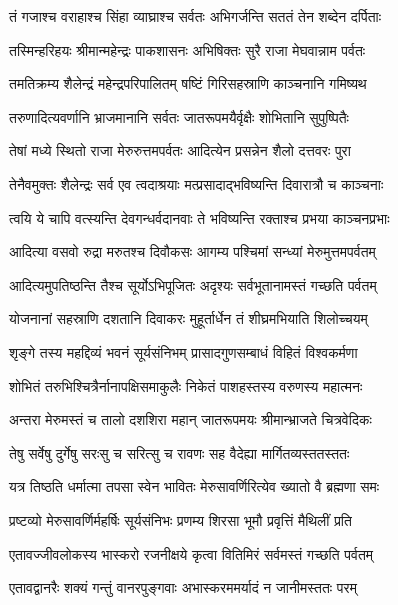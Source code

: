 \twolineshloka
{तं गजाश्च वराहाश्च सिंहा व्याघ्राश्च सर्वतः}
{अभिगर्जन्ति सततं तेन शब्देन दर्पिताः} %

\twolineshloka
{तस्मिन्हरिहयः श्रीमान्महेन्द्रः पाकशासनः}
{अभिषिक्तः सुरै राजा मेघवान्नाम पर्वतः} %

\twolineshloka
{तमतिक्रम्य शैलेन्द्रं महेन्द्रपरिपालितम्}
{षष्टिं गिरिसहस्राणि काञ्चनानि गमिष्यथ} %

\twolineshloka
{तरुणादित्यवर्णानि भ्राजमानानि सर्वतः}
{जातरूपमयैर्वृक्षैः शोभितानि सुपुष्पितैः} %

\twolineshloka
{तेषां मध्ये स्थितो राजा मेरुरुत्तमपर्वतः}
{आदित्येन प्रसन्नेन शैलो दत्तवरः पुरा} %

\twolineshloka
{तेनैवमुक्तः शैलेन्द्रः सर्व एव त्वदाश्रयाः}
{मत्प्रसादाद्भविष्यन्ति दिवारात्रौ च काञ्चनाः} %

\twolineshloka
{त्वयि ये चापि वत्स्यन्ति देवगन्धर्वदानवाः}
{ते भविष्यन्ति रक्ताश्च प्रभया काञ्चनप्रभाः} %

\twolineshloka
{आदित्या वसवो रुद्रा मरुतश्च दिवौकसः}
{आगम्य पश्चिमां सन्ध्यां मेरुमुत्तमपर्वतम्} %

\twolineshloka
{आदित्यमुपतिष्ठन्ति तैश्च सूर्योऽभिपूजितः}
{अदृश्यः सर्वभूतानामस्तं गच्छति पर्वतम्} %

\twolineshloka
{योजनानां सहस्राणि दशतानि दिवाकरः}
{मुहूर्तार्धेन तं शीघ्रमभियाति शिलोच्चयम्} %

\twolineshloka
{शृङ्गे तस्य महद्दिव्यं भवनं सूर्यसंनिभम्}
{प्रासादगुणसम्बाधं विहितं विश्वकर्मणा} %

\twolineshloka
{शोभितं तरुभिश्चित्रैर्नानापक्षिसमाकुलैः}
{निकेतं पाशहस्तस्य वरुणस्य महात्मनः} %

\twolineshloka
{अन्तरा मेरुमस्तं च तालो दशशिरा महान्}
{जातरूपमयः श्रीमान्भ्राजते चित्रवेदिकः} %

\twolineshloka
{तेषु सर्वेषु दुर्गेषु सरःसु च सरित्सु च}
{रावणः सह वैदेह्या मार्गितव्यस्ततस्ततः} %

\twolineshloka
{यत्र तिष्ठति धर्मात्मा तपसा स्वेन भावितः}
{मेरुसावर्णिरित्येव ख्यातो वै ब्रह्मणा समः} %

\twolineshloka
{प्रष्टव्यो मेरुसावर्णिर्महर्षिः सूर्यसंनिभः}
{प्रणम्य शिरसा भूमौ प्रवृत्तिं मैथिलीं प्रति} %

\twolineshloka
{एतावज्जीवलोकस्य भास्करो रजनीक्षये}
{कृत्वा वितिमिरं सर्वमस्तं गच्छति पर्वतम्} %

\twolineshloka
{एतावद्वानरैः शक्यं गन्तुं वानरपुङ्गवाः}
{अभास्करममर्यादं न जानीमस्ततः परम्} %


